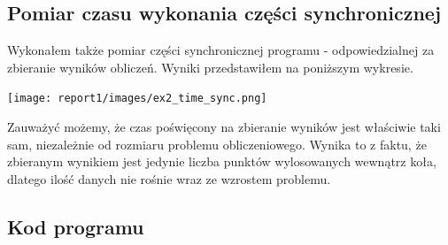 \documentclass{article}
\begin{document}
        \subsection{Pomiar czasu wykonania części synchronicznej}
        Wykonałem także pomiar części synchronicznej programu - odpowiedzialnej za zbieranie wyników obliczeń. Wyniki przedstawiłem na poniższym wykresie. 
        \begin{center}
            \texttt{[image: report1/images/ex2\_time\_sync.png]}
        \end{center}
        Zauważyć możemy, że czas poświęcony na zbieranie wyników jest właściwie taki sam, niezależnie od rozmiaru problemu obliczeniowego. Wynika to z faktu, że zbieranym wynikiem jest jedynie liczba punktów wylosowanych wewnątrz koła, dlatego ilość danych nie rośnie wraz ze wzrostem problemu. 

        \subsection{Kod programu}
        
        
\end{document}
